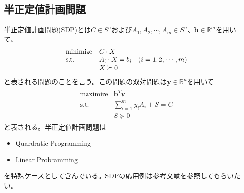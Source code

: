 \subsection{半正定値計画問題}
半正定値計画問題(SDP)とは$C \in S^n$および$A_1, A_2, \cdots, A_m \in S^n$、$\mathbf{b} \in \mathbb{R}^m$を用いて、
\begin{align} \label{MainProblem}
  \begin{array}{lll}
    \mathrm{minimize} & C \cdot X \\
    \mathrm{s.t.}     & A_i \cdot X = b_i & \parenthesis(i = 1, 2, \cdots, m) \\
                      & X \succeq 0
  \end{array}
\end{align}
と表される問題のことを言う。この問題の双対問題は$\mathbf{y} \in \mathbb{R}^n$を用いて
\begin{align} \label{DualProblem}
  \begin{array}{lll}
    \mathrm{maximize} & \mathbf{b}^T \mathbf{y} \\
    \mathrm{s.t.}     & \displaystyle{\sum_{i = 1}^m} y_i A_i + S = C \\
                      & S \succeq 0
  \end{array}
\end{align}
と表される。半正定値計画問題は
\begin{itemize}
  \item Quardratic Programming
  \item Linear Probramming
\end{itemize}
を特殊ケースとして含んでいる。SDPの応用例は参考文献を参照してもらいたい\cite*{Applications}。


